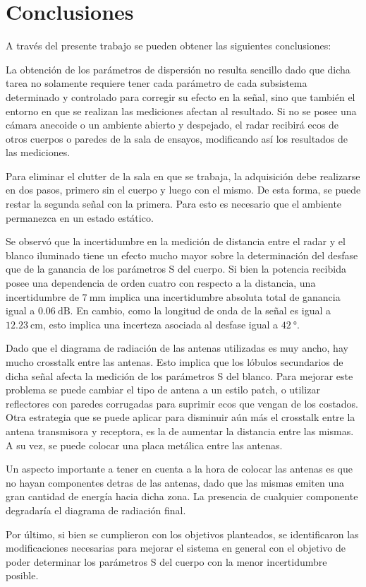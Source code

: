 \chapter{Conclusiones} \label{ch:conclusions}

\ifpdf
    \graphicspath{{Chapter6/Figs/Raster/}{Chapter6/Figs/PDF/}{Chapter6/Figs/}}
\else
    \graphicspath{{Chapter6/Figs/Vector/}{Chapter6/Figs/}}
\fi

A través del presente trabajo se pueden obtener las siguientes conclusiones:

La obtención de los parámetros de dispersión no resulta sencillo dado que dicha tarea no solamente requiere tener cada parámetro de cada subsistema determinado y controlado para corregir su efecto en la señal, sino que también el entorno en que se realizan las mediciones afectan al resultado. Si no se posee una cámara anecoide o un ambiente abierto y despejado, el radar recibirá ecos de otros cuerpos o paredes de la sala de ensayos, modificando así los resultados de las mediciones.

Para eliminar el clutter de la sala en que se trabaja, la adquisición debe realizarse en dos pasos, primero sin el cuerpo y luego con el mismo. De esta forma, se puede restar la segunda señal con la primera. Para esto es necesario que el ambiente permanezca en un estado estático.

Se observó que la incertidumbre en la medición de distancia entre el radar y el blanco iluminado tiene un efecto mucho mayor sobre la determinación del desfase que de la ganancia de los parámetros S del cuerpo. Si bien la potencia recibida posee una dependencia de orden cuatro con respecto a la distancia, una incertidumbre de $\SI{7}{\milli\meter}$ implica una incertidumbre absoluta total de ganancia igual a $\SI{0.06}{\dB}$. En cambio, como la longitud de onda de la señal es igual a $\SI{12.23}{\centi\meter}$, esto implica una incerteza asociada al desfase igual a $\SI{42}{\degree}$.

Dado que el diagrama de radiación de las antenas utilizadas es muy ancho, hay mucho crosstalk entre las antenas. Esto implica que los lóbulos secundarios de dicha señal afecta la medición de los parámetros S del blanco. Para mejorar este problema se puede cambiar el tipo de antena a un estilo patch, o utilizar reflectores con paredes corrugadas para suprimir ecos que vengan de los costados. Otra estrategia que se puede aplicar para disminuir aún más el crosstalk entre la antena transmisora y receptora, es la de aumentar la distancia entre las mismas. A su vez, se puede colocar una placa metálica entre las antenas.

Un aspecto importante a tener en cuenta a la hora de colocar las antenas es que no hayan componentes detras de las antenas, dado que las mismas emiten una gran cantidad de energía hacia dicha zona. La presencia de cualquier componente degradaría el diagrama de radiación final.

Por último, si bien se cumplieron con los objetivos planteados, se identificaron las modificaciones necesarias para mejorar el sistema en general con el objetivo de poder determinar los parámetros S del cuerpo con la menor incertidumbre posible.